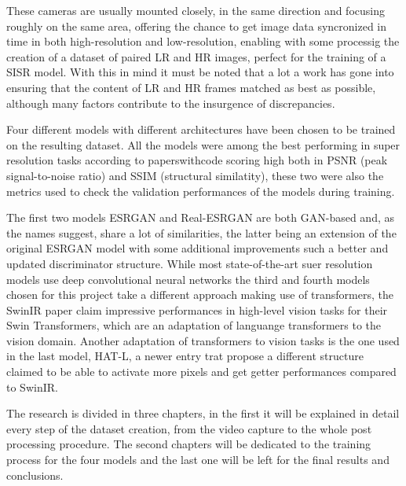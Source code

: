 These cameras are usually mounted closely, in the same direction and focusing roughly on the same area, offering the chance to get image data syncronized in time in both high-resolution and low-resolution, enabling with some processig the creation of a dataset of paired LR and HR images, perfect for the training of a SISR model. With this in mind it must be noted that a lot a work has gone into ensuring that the content of LR and HR frames matched as best as possible, although many factors contribute to the insurgence of discrepancies.

Four different models with different architectures have been chosen to be trained on the resulting dataset. All the models were among the best performing in super resolution tasks according to paperswithcode \cite{pwcode} scoring high both in PSNR\cite{psnr} (peak signal-to-noise ratio) and SSIM\cite{ssim} (structural similatity), these two were also the metrics used to check the validation performances of the models during training.

The first two models ESRGAN\cite{wang2018esrgan} and Real-ESRGAN\cite{wang2021realesrgan} are both GAN-based and, as the names suggest, share a lot of similarities, the latter being an extension of the original ESRGAN model with some additional improvements such a better and updated discriminator structure. While most state-of-the-art suer resolution models use deep convolutional neural networks the third and fourth models chosen for this project take a different approach making use of transformers, the SwinIR\cite{liang2021swinir} paper claim impressive performances in high-level vision tasks for their Swin Transformers\cite{liu2021swin}, which are an adaptation of languange transformers to the vision domain. Another adaptation of transformers to vision tasks is the one used in the last model, HAT-L\cite{chen2023activating}, a newer entry trat propose a different structure claimed to be able to activate more pixels and get getter performances compared to SwinIR.

The research is divided in three chapters, in the first it will be explained in detail every step of the dataset creation, from the video capture to the whole post processing procedure. The second chapters will be dedicated to the training process for the four models and the last one will be left for the final results and conclusions.
